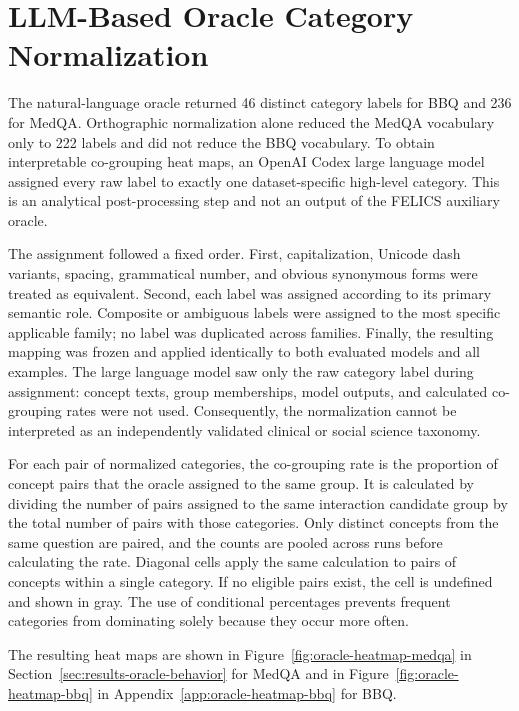 \chapter{LLM-Based Oracle Category Normalization}
\label{app:oracle-category-normalization}

The natural-language oracle returned 46 distinct category labels for BBQ and 236 for
MedQA. Orthographic normalization alone reduced the MedQA vocabulary only to 222 labels
and did not reduce the BBQ vocabulary. To obtain interpretable co-grouping heat maps, an
OpenAI Codex large language model assigned every raw label to exactly one
dataset-specific high-level category. This is an analytical post-processing step and
not an output of the FELICS auxiliary oracle.

The assignment followed a fixed order. First, capitalization, Unicode dash variants,
spacing, grammatical number, and obvious synonymous forms were treated as equivalent.
Second, each label was assigned according to its primary semantic role. Composite or
ambiguous labels were assigned to the most specific applicable family; no label was
duplicated across families. Finally, the resulting mapping was frozen and applied
identically to both evaluated models and all examples. The large language model saw
only the raw category label during assignment: concept texts, group memberships,
model outputs, and calculated co-grouping rates were not used. Consequently, the
normalization cannot be interpreted as an independently validated clinical or social
science taxonomy.

For each pair of normalized categories, the co-grouping rate is the proportion of concept pairs that the oracle assigned to the same group. It is calculated by dividing the number of pairs assigned to the same interaction candidate group by the total number of pairs with those categories. Only distinct concepts from the same question are paired, and the counts are pooled across runs before calculating the rate. Diagonal cells apply the same calculation to pairs of concepts within a single category. If no eligible pairs exist, the cell is undefined and shown in gray. The use of conditional percentages prevents frequent categories from dominating solely because they occur more often.

The resulting heat maps are shown in Figure~\ref{fig:oracle-heatmap-medqa} in Section~\ref{sec:results-oracle-behavior} for MedQA and in Figure~\ref{fig:oracle-heatmap-bbq} in Appendix~\ref{app:oracle-heatmap-bbq} for BBQ.

